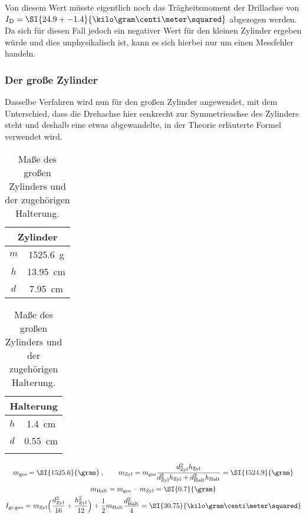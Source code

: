 Von diesem Wert müsste eigentlich noch das Trägheitsmoment der Drillachse von ${I_\text{D}=\SI{24.9+-1.4}{\kilo\gram\centi\meter\squared}}$ 
abgezogen werden. Da sich für diesen Fall jedoch ein negativer Wert für den kleinen Zylinder ergeben würde und dies 
unphysikalisch ist, kann es sich hierbei nur um einen Messfehler handeln. 

\FloatBarrier
\subsubsection{Der große Zylinder}

Dasselbe Verfahren wird nun für den großen Zylinder angewendet, mit dem Unterschied, dass die Drehachse hier senkrecht zur 
Symmetrieachse des Zylinders steht und deshalb eine etwas abgewandelte, in der Theorie erläuterte Formel verwendet wird. 

\begin{table}
    \centering
    \caption{Maße des großen Zylinders und der zugehörigen Halterung.}
    \label{tab:groZyl}
    \begin{tabular}{c c}
        \toprule
        \multicolumn{2}{c}{Zylinder}\\
        \midrule
        $m$ & \SI{1525.6}{\gram} \\
        $h$ & \SI{13.95}{\centi\meter} \\
        $d$ & \SI{7.95}{\centi\meter} \\
        \bottomrule
    \end{tabular}
    \qquad \qquad 
    \begin{tabular}{c c}
        \toprule
        \multicolumn{2}{c}{Halterung}\\
        \midrule
        $h$ & \SI{1.4}{\centi\meter} \\
        $d$ & \SI{0.55}{\centi\meter} \\ 
        \bottomrule
            \\
    \end{tabular}
\end{table}

\begin{gather}
    m_\text{ges}=\SI{1525.6}{\gram}\:, \qquad 
    m_\text{Zyl}=m_\text{ges}\frac{d_\text{Zyl}^2h_\text{Zyl}}{d_\text{Zyl}^2h_\text{Zyl}+d_\text{Halt}^2h_\text{Halt}}=\SI{1524.9}{\gram} \\
    m_\text{Halt} = m_\text{ges}-m_\text{Zyl}=\SI{0.7}{\gram} \\
    I_\text{gr,geo}=m_\text{Zyl} \Bigl( \frac{d_\text{Zyl}^2}{16} + \frac{h_\text{Zyl}^2}{12} \Bigr) 
        +\frac{1}{2}m_\text{Halt}\frac{d_\text{Halt}^2}{4}=\SI{30.75}{\kilo\gram\centi\meter\squared}
\end{gather}

